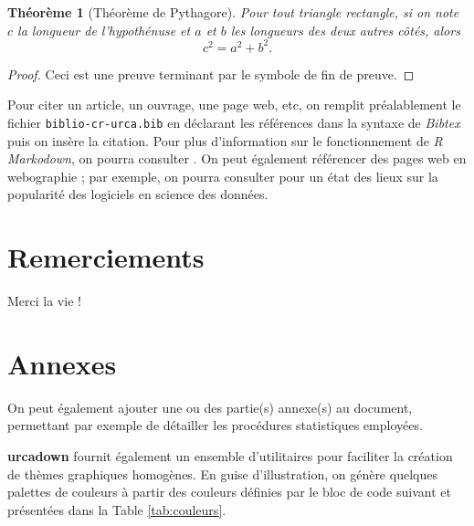 \documentclass[french,]{compterendu}
\theoremstyle{urcastyle}
\newtheorem{theorem}{Théorème}
\theoremstyle{remark}
\begin{document}
\begin{theorem}[Théorème de Pythagore]
\protect\hypertarget{thm:theoex}{}\label{thm:theoex}Pour tout triangle rectangle, si on note \(c\) la longueur de l'hypothénuse et \(a\) et \(b\) les longueurs des deux autres côtés, alors
\[c^2 = a^2 + b^2.\]
\end{theorem}

\begin{proof}
Ceci est une preuve terminant par le symbole de fin de preuve.
\end{proof}

Pour citer un article, un ouvrage, une page web, etc, on remplit préalablement le fichier \texttt{biblio-cr-urca.bib} en déclarant les références dans la syntaxe de \emph{Bibtex} puis on insère la citation. Pour plus d'information sur le fonctionnement de \emph{R Markodown}, on pourra consulter \textcite{rmarkdown_refbook2018}. On peut également référencer des pages web en webographie ;
par exemple, on pourra consulter \textcite{canales_luna_top_2022} pour un état des lieux sur la popularité des logiciels en science des données.

\section*{Remerciements}\label{remerciements}

Merci la vie !

\appendix


\section{Annexes}\label{annexes}

On peut également ajouter une ou des partie(s) annexe(s) au document, permettant par exemple de détailler les procédures statistiques employées.

\textbf{urcadown} fournit également un ensemble d'utilitaires pour faciliter la création de thèmes graphiques homogènes. En guise d'illustration, on génère quelques palettes de couleurs à partir des couleurs définies par le bloc de code suivant et présentées dans la Table \ref{tab:couleurs}.
\end{document}

